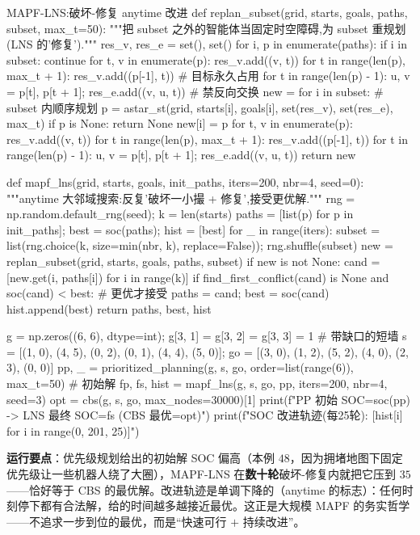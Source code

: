 \begin{codebox}[Python]{MAPF-LNS:破坏-修复 anytime 改进}
def replan_subset(grid, starts, goals, paths, subset, max_t=50):
    """把 subset 之外的智能体当固定时空障碍,为 subset 重规划(LNS 的'修复')."""
    res_v, res_e = set(), set()
    for i, p in enumerate(paths):
        if i in subset: continue
        for t, v in enumerate(p): res_v.add((v, t))
        for t in range(len(p), max_t + 1): res_v.add((p[-1], t))     # 目标永久占用
        for t in range(len(p) - 1):
            u, v = p[t], p[t + 1]; res_e.add((v, u, t))              # 禁反向交换
    new = {}
    for i in subset:                                                  # subset 内顺序规划
        p = astar_st(grid, starts[i], goals[i], set(res_v), set(res_e), max_t)
        if p is None: return None
        new[i] = p
        for t, v in enumerate(p): res_v.add((v, t))
        for t in range(len(p), max_t + 1): res_v.add((p[-1], t))
        for t in range(len(p) - 1):
            u, v = p[t], p[t + 1]; res_e.add((v, u, t))
    return new

def mapf_lns(grid, starts, goals, init_paths, iters=200, nbr=4, seed=0):
    """anytime 大邻域搜索:反复'破坏一小撮 + 修复',接受更优解."""
    rng = np.random.default_rng(seed); k = len(starts)
    paths = [list(p) for p in init_paths]; best = soc(paths); hist = [best]
    for _ in range(iters):
        subset = list(rng.choice(k, size=min(nbr, k), replace=False)); rng.shuffle(subset)
        new = replan_subset(grid, starts, goals, paths, subset)
        if new is not None:
            cand = [new.get(i, paths[i]) for i in range(k)]
            if find_first_conflict(cand) is None and soc(cand) < best:   # 更优才接受
                paths = cand; best = soc(cand)
        hist.append(best)
    return paths, best, hist

g = np.zeros((6, 6), dtype=int); g[3, 1] = g[3, 2] = g[3, 3] = 1     # 带缺口的短墙
s  = [(1, 0), (4, 5), (0, 2), (0, 1), (4, 4), (5, 0)]; go = [(3, 0), (1, 2), (5, 2), (4, 0), (2, 3), (0, 0)]
pp, _ = prioritized_planning(g, s, go, order=list(range(6)), max_t=50)   # 初始解
fp, fs, hist = mapf_lns(g, s, go, pp, iters=200, nbr=4, seed=3)
opt = cbs(g, s, go, max_nodes=30000)[1]
print(f"PP 初始 SOC={soc(pp)} -> LNS 最终 SOC={fs} (CBS 最优={opt})")
print(f"SOC 改进轨迹(每25轮): {[hist[i] for i in range(0, 201, 25)]}")
\end{codebox}

\textbf{运行要点}：优先级规划给出的初始解 SOC 偏高（本例 $48$，因为拥堵地图下固定优先级让一些机器人绕了大圈），MAPF-LNS 在\textbf{数十轮}破坏-修复内就把它压到 $35$——恰好等于 CBS 的最优解。改进轨迹是单调下降的（anytime 的标志）：任何时刻停下都有合法解，给的时间越多越接近最优。这正是大规模 MAPF 的务实哲学——不追求一步到位的最优，而是“快速可行 $+$ 持续改进”。

